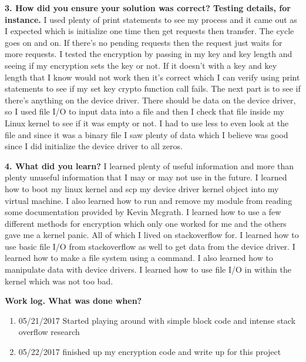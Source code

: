 \documentclass[draftclsnofoot,onecolumn,letterpaper,10pt,titlepage]{IEEEtran}
\begin{document}
	\textbf{3. How did you ensure your solution was correct? Testing details, for instance.}
    I used plenty of print statements to see my process and it came out as I expected which is initialize one time then get requests then transfer. The cycle goes on and on. If there's no pending requests then the request just waits for more requests. I tested the encryption by passing in my key and key length and seeing if my encryption sets the key or not. If it doesn't with a key and key length that I know would not work then it's correct which I can verify using print statements to see if my set key crypto function call fails. The next part is to see if there's anything on the device driver. There should be data on the device driver, so I used file I/O to input data into a file and then I check that file inside my Linux kernel to see if it was empty or not. I had to use less to even look at the file and since it was a binary file I saw plenty of data which I believe was good since I did initialize the device driver to all zeros.

    \textbf{4. What did you learn?}
	I learned plenty of useful information and more than plenty unuseful information that I may or may not use in the future. I learned how to boot my linux kernel and scp my device driver kernel object into my virtual machine. I also learned how to run and remove my module from reading some documentation provided by Kevin Mcgrath. I learned how to use a few different methods for encryption which only one worked for me and the others gave me a kernel panic. All of which I lived on stackoverflow for. I learned how to use basic file I/O from stackoverflow as well to get data from the device driver. I learned how to make a file system using a command. I also learned how to manipulate data with device drivers. I learned how to use file I/O in within the kernel which was not too bad.


\bigskip

\noindent

\textbf{Work log. What was done when?}
\begin{enumerate}
\item 05/21/2017 Started playing around with simple block code and intense stack overflow research
\item 05/22/2017 finished up my encryption code and write up for this project
\end{enumerate}
\end{document}
